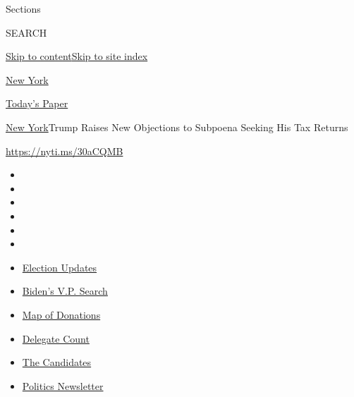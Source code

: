 Sections

SEARCH

\protect\hyperlink{site-content}{Skip to
content}\protect\hyperlink{site-index}{Skip to site index}

\href{https://www.nytimes3xbfgragh.onion/section/nyregion}{New York}

\href{https://myaccount.nytimes3xbfgragh.onion/auth/login?response_type=cookie\&client_id=vi}{}

\href{https://www.nytimes3xbfgragh.onion/section/todayspaper}{Today's
Paper}

\href{/section/nyregion}{New York}\textbar{}Trump Raises New Objections
to Subpoena Seeking His Tax Returns

\url{https://nyti.ms/30aCQMB}

\begin{itemize}
\item
\item
\item
\item
\item
\item
\end{itemize}

\begin{itemize}
\item
  \href{https://www.nytimes3xbfgragh.onion/2020/08/03/us/elections/biden-vs-trump.html?action=click\&pgtype=Article\&state=default\&region=TOP_BANNER\&context=storylines_menu}{Election
  Updates}
\item
  \href{https://www.nytimes3xbfgragh.onion/article/biden-vice-president-2020.html?action=click\&pgtype=Article\&state=default\&region=TOP_BANNER\&context=storylines_menu}{Biden's
  V.P. Search}
\item
  \href{https://www.nytimes3xbfgragh.onion/interactive/2020/07/24/us/politics/trump-biden-campaign-donors.html?action=click\&pgtype=Article\&state=default\&region=TOP_BANNER\&context=storylines_menu}{Map
  of Donations}
\item
  \href{https://www.nytimes3xbfgragh.onion/interactive/2020/us/elections/delegate-count-primary-results.html?action=click\&pgtype=Article\&state=default\&region=TOP_BANNER\&context=storylines_menu}{Delegate
  Count}
\item
  \href{https://www.nytimes3xbfgragh.onion/interactive/2019/us/politics/2020-presidential-candidates.html?action=click\&pgtype=Article\&state=default\&region=TOP_BANNER\&context=storylines_menu}{The
  Candidates}
\item
  \href{https://www.nytimes3xbfgragh.onion/newsletters/politics?action=click\&pgtype=Article\&state=default\&region=TOP_BANNER\&context=storylines_menu}{Politics
  Newsletter}
\end{itemize}

